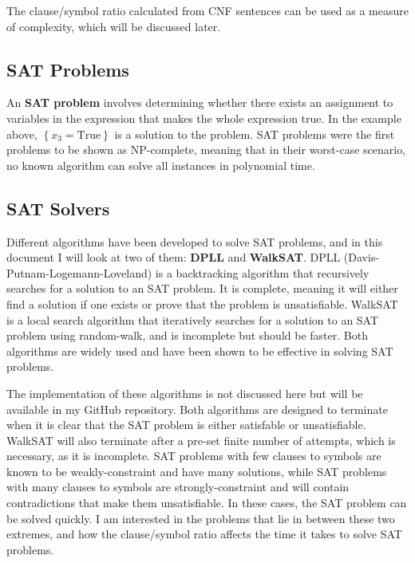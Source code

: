 \documentclass{article}
\begin{document}
    The clause/symbol ratio calculated from CNF sentences can be used as a measure of complexity, which will be discussed later.

    \subsection{SAT Problems}

    An \textbf{SAT problem} involves determining whether there exists an assignment to variables in the expression that makes the whole expression true.\supercite{sat-np-complete-cook} In the example above, $\left\{x_3 = \text{True}\right\}$ is a solution to the problem. SAT problems were the first problems to be shown as NP-complete, meaning that in their worst-case scenario, no known algorithm can solve all instances in polynomial time.\supercite{britannica-np-complete}

    \subsection{SAT Solvers}
    Different algorithms have been developed to solve SAT problems, and in this document I will look at two of them: \textbf{DPLL} and \textbf{WalkSAT}. DPLL (Davis-Putnam-Logemann-Loveland) is a backtracking algorithm that recursively searches for a solution to an SAT problem. It is complete, meaning it will either find a solution if one exists or prove that the problem is unsatisfiable. WalkSAT is a local search algorithm that iteratively searches for a solution to an SAT problem using random-walk, and is incomplete but should be faster. Both algorithms are widely used and have been shown to be effective in solving SAT problems.\supercite{dpll-algorithm}\supercite{selman1994noise}

    The implementation of these algorithms is not discussed here but will be available in my GitHub repository. Both algorithms are designed to terminate when it is clear that the SAT problem is either satisfable or unsatisfiable. WalkSAT will also terminate after a pre-set finite number of attempts, which is necessary, as it is incomplete. SAT problems with few clauses to symbols are known to be weakly-constraint and have many solutions, while SAT problems with many clauses to symbols are strongly-constraint and will contain contradictions that make them unsatisfiable.\supercite{Norvig_2021} In these cases, the SAT problem can be solved quickly. I am interested in the problems that lie in between these two extremes, and how the clause/symbol ratio affects the time it takes to solve SAT problems.
\end{document}
